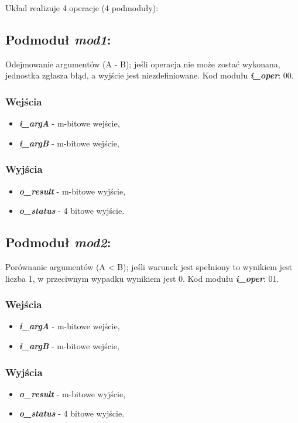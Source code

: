 Układ realizuje 4 operacje (4 podmoduły):

\subsection{Podmoduł \emph{mod1}:}
Odejmowanie argumentów (A -  B); jeśli operacja nie może zostać wykonana, jednostka zgłasza błąd, a wyjście jest niezdefiniowane. Kod modułu \textbf{\emph{i\_oper}}: 00.

\subsubsection*{Wejścia}
\begin{itemize}
	\item \emph{\textbf{i\_argA}} - m-bitowe wejście,
	\item \emph{\textbf{i\_argB}} - m-bitowe wejście,
\end{itemize}
\subsubsection*{Wyjścia}
\begin{itemize} 
	\item \emph{\textbf{o\_result}} - m-bitowe wyjście,
	\item \emph{\textbf{o\_status}} - 4 bitowe wyjście.
\end{itemize}

\subsection{Podmoduł \emph{mod2}:}
Porównanie argumentów (A < B); jeśli warunek jest spełniony to wynikiem jest liczba 1, w przeciwnym wypadku wynikiem jest 0. Kod modułu \textbf{\emph{i\_oper}}: 01.

\subsubsection*{Wejścia}
\begin{itemize}
	\item \emph{\textbf{i\_argA}} - m-bitowe wejście,
	\item \emph{\textbf{i\_argB}} - m-bitowe wejście,
\end{itemize}
\subsubsection*{Wyjścia}
\begin{itemize}
	\item \emph{\textbf{o\_result}} - m-bitowe wyjście,
	\item \emph{\textbf{o\_status}} - 4 bitowe wyjście.
\end{itemize}

